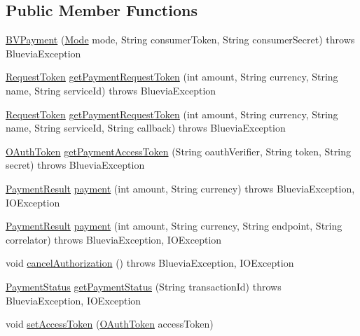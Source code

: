 \subsection*{Public Member Functions}
\begin{DoxyCompactItemize}
\item 
\hyperlink{classcom_1_1bluevia_1_1payment_1_1client_1_1BVPayment_a5a68583aad1f3173b22441b5e3b976b4}{BVPayment} (\hyperlink{classcom_1_1bluevia_1_1commons_1_1client_1_1BVBaseClient_a5f4a4a27d73a8ddd0ce450a6c7a4d1b7}{Mode} mode, String consumerToken, String consumerSecret)  throws BlueviaException 
\item 
\hyperlink{classcom_1_1bluevia_1_1commons_1_1connector_1_1http_1_1oauth_1_1RequestToken}{RequestToken} \hyperlink{classcom_1_1bluevia_1_1payment_1_1client_1_1BVPayment_a461ecfef018815ed3436c16c68852ec7}{getPaymentRequestToken} (int amount, String currency, String name, String serviceId)  throws BlueviaException 
\item 
\hyperlink{classcom_1_1bluevia_1_1commons_1_1connector_1_1http_1_1oauth_1_1RequestToken}{RequestToken} \hyperlink{classcom_1_1bluevia_1_1payment_1_1client_1_1BVPayment_ac43958ebc6ff5145d3db8df79c2d999c}{getPaymentRequestToken} (int amount, String currency, String name, String serviceId, String callback)  throws BlueviaException 
\item 
\hyperlink{classcom_1_1bluevia_1_1commons_1_1connector_1_1http_1_1oauth_1_1OAuthToken}{OAuthToken} \hyperlink{classcom_1_1bluevia_1_1payment_1_1client_1_1BVPayment_a40a262c6f375755dcb52f9bd2831ed98}{getPaymentAccessToken} (String oauthVerifier, String token, String secret)  throws BlueviaException 
\item 
\hyperlink{classcom_1_1bluevia_1_1payment_1_1data_1_1PaymentResult}{PaymentResult} \hyperlink{classcom_1_1bluevia_1_1payment_1_1client_1_1BVPayment_abfca5647bbeffcb9b48b32917dfd41f3}{payment} (int amount, String currency)  throws BlueviaException, IOException 
\item 
\hyperlink{classcom_1_1bluevia_1_1payment_1_1data_1_1PaymentResult}{PaymentResult} \hyperlink{classcom_1_1bluevia_1_1payment_1_1client_1_1BVPayment_ae5e9baccc8f7a9a4a441b701e456a092}{payment} (int amount, String currency, String endpoint, String correlator)  throws BlueviaException, IOException 
\item 
void \hyperlink{classcom_1_1bluevia_1_1payment_1_1client_1_1BVPayment_a246785149105de4acdb6903491dbc623}{cancelAuthorization} ()  throws BlueviaException, IOException 
\item 
\hyperlink{classcom_1_1bluevia_1_1payment_1_1data_1_1PaymentStatus}{PaymentStatus} \hyperlink{classcom_1_1bluevia_1_1payment_1_1client_1_1BVPayment_a7938eb7923f88c81622f95ec64ad8a78}{getPaymentStatus} (String transactionId)  throws BlueviaException, IOException
\item 
void \hyperlink{classcom_1_1bluevia_1_1payment_1_1client_1_1BVPayment_a6e9d873055043c197ff745f468efe8f5}{setAccessToken} (\hyperlink{classcom_1_1bluevia_1_1commons_1_1connector_1_1http_1_1oauth_1_1OAuthToken}{OAuthToken} accessToken)
\end{DoxyCompactItemize}
